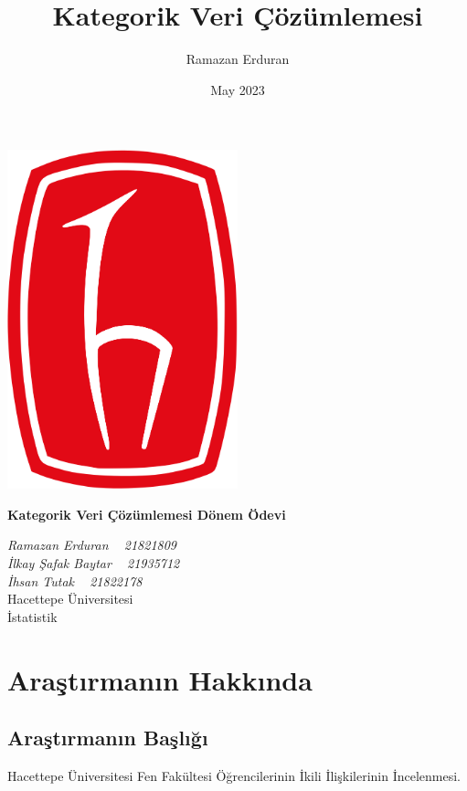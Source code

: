 \documentclass{article}
\title{Kategorik Veri Çözümlemesi}
\author{Ramazan Erduran}
\date{May 2023}
\begin{document}
\begin{titlepage}
    \begin{center}
        \includegraphics[width=0.5\textwidth]{Imgs/hacettepe_logo.png}
        
        \vspace*{1cm}
        \Huge
        \textbf{Kategorik Veri Çözümlemesi Dönem Ödevi}

        \vfill
        
        \Large
        \textit{Ramazan Erduran ~ 21821809 \\
        İlkay Şafak Baytar ~ 21935712 \\
        İhsan Tutak ~ 21822178
        }\\
        
        \vfill
        Hacettepe Üniversitesi \\
        İstatistik \\
        
    \end{center}
\end{titlepage}

\newpage

\tableofcontents
\clearpage

\section{Araştırmanın Hakkında}
\subsection{Araştırmanın Başlığı}
Hacettepe Üniversitesi Fen Fakültesi Öğrencilerinin İkili İlişkilerinin İncelenmesi.
\end{document}
